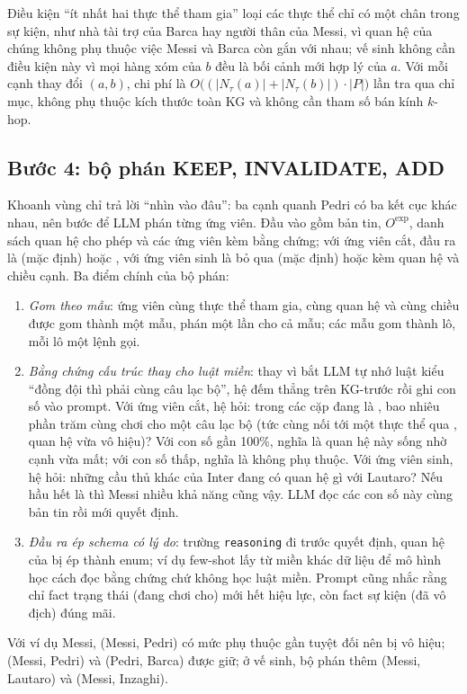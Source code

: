 Điều kiện ``ít nhất hai thực thể tham gia'' loại các thực thể chỉ có một chân trong sự kiện, như nhà tài trợ của Barca hay người thân của Messi, vì quan hệ của chúng không phụ thuộc việc Messi và Barca còn gắn với nhau; vế sinh không cần điều kiện này vì mọi hàng xóm của $b$ đều là bối cảnh mới hợp lý của $a$.
Với mỗi cạnh thay đổi $(a,b)$, chi phí là $O\bigl((|N_\tau(a)|+|N_\tau(b)|)\cdot|P|\bigr)$ lần tra qua chỉ mục, không phụ thuộc kích thước toàn KG và không cần tham số bán kính $k$-hop.

\subsection{Bước 4: bộ phán KEEP, INVALIDATE, ADD}\label{sec:step-judge}

Khoanh vùng chỉ trả lời ``nhìn vào đâu'': ba cạnh quanh Pedri có ba kết cục khác nhau, nên bước  để LLM phán từng ứng viên.
Đầu vào gồm bản tin, $O^{\mathrm{exp}}$, danh sách quan hệ cho phép và các ứng viên kèm bằng chứng; với ứng viên cắt, đầu ra là  (mặc định) hoặc , với ứng viên sinh là bỏ qua (mặc định) hoặc  kèm quan hệ và chiều cạnh.
Ba điểm chính của bộ phán:
\begin{enumerate}
  \item \emph{Gom theo mẫu}: ứng viên cùng thực thể tham gia, cùng quan hệ và cùng chiều được gom thành một mẫu, phán một lần cho cả mẫu; các mẫu gom thành lô, mỗi lô một lệnh gọi.
  \item \emph{Bằng chứng cấu trúc thay cho luật miền}: thay vì bắt LLM tự nhớ luật kiểu ``đồng đội thì phải cùng câu lạc bộ'', hệ đếm thẳng trên KG-trước rồi ghi con số vào prompt. Với ứng viên cắt, hệ hỏi: trong các cặp đang là , bao nhiêu phần trăm cùng chơi cho một câu lạc bộ (tức cùng nối tới một thực thể qua , quan hệ vừa vô hiệu)? Với  con số gần 100\%, nghĩa là quan hệ này sống nhờ cạnh vừa mất; với  con số thấp, nghĩa là không phụ thuộc. Với ứng viên sinh, hệ hỏi: những cầu thủ khác của Inter đang có quan hệ gì với Lautaro? Nếu hầu hết là  thì Messi nhiều khả năng cũng vậy. LLM đọc các con số này cùng bản tin rồi mới quyết định.
  \item \emph{Đầu ra ép schema có lý do}: trường \texttt{reasoning} đi trước quyết định, quan hệ của  bị ép thành enum; ví dụ few-shot lấy từ miền khác dữ liệu để mô hình học cách đọc bằng chứng chứ không học luật miền. Prompt cũng nhắc rằng chỉ fact trạng thái (đang chơi cho) mới hết hiệu lực, còn fact sự kiện (đã vô địch) đúng mãi.
\end{enumerate}
Với ví dụ Messi, (Messi, Pedri) có mức phụ thuộc gần tuyệt đối nên bị vô hiệu; (Messi, Pedri) và (Pedri, Barca) được giữ; ở vế sinh, bộ phán thêm (Messi, Lautaro) và (Messi, Inzaghi).

